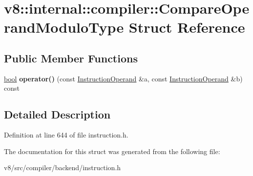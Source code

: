 \hypertarget{structv8_1_1internal_1_1compiler_1_1CompareOperandModuloType}{}\section{v8\+:\+:internal\+:\+:compiler\+:\+:Compare\+Operand\+Modulo\+Type Struct Reference}
\label{structv8_1_1internal_1_1compiler_1_1CompareOperandModuloType}
\subsection*{Public Member Functions}
\begin{DoxyCompactItemize}
\item 
\mbox{\label{structv8_1_1internal_1_1compiler_1_1CompareOperandModuloType_a6b2f4836e18e99f5a69b744255b9e40f}} 
\mbox{\hyperlink{classbool}{bool}} {\bfseries operator()} (const \mbox{\hyperlink{classv8_1_1internal_1_1compiler_1_1InstructionOperand}{Instruction\+Operand}} \&a, const \mbox{\hyperlink{classv8_1_1internal_1_1compiler_1_1InstructionOperand}{Instruction\+Operand}} \&b) const
\end{DoxyCompactItemize}


\subsection{Detailed Description}


Definition at line 644 of file instruction.\+h.



The documentation for this struct was generated from the following file\+:\begin{DoxyCompactItemize}
\item 
v8/src/compiler/backend/instruction.\+h\end{DoxyCompactItemize}
